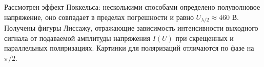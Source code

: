 \documentclass[a4paper,12pt]{article}
\begin{document}
Рассмотрен эффект Поккельса: несколькими способами определено полуволновое напряжение, оно совпадает в пределах погрешности и равно $U_{\lambda/2} \approx 460$ В. Получены фигуры Лиссажу, отражающие зависимость интенсивности выходного сигнала от подаваемой амплитуды напряжения $I(U)$ при скрещенных и параллельных поляризациях. Картинки для поляризаций отличаются по фазе на $\pi/2$.

\begin{figure}[h]
	\begin{minipage}[h]{0.3\linewidth}
	\end{minipage}
	\hfill
	\begin{minipage}[h]{0.3\linewidth}

\end{minipage}
\end{figure}
\end{document}

